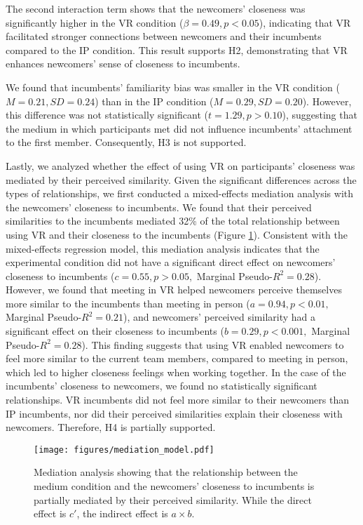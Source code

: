 The second interaction term shows that the newcomers' closeness was significantly higher in the VR condition ($\beta=0.49,p<0.05$), indicating that VR facilitated stronger connections between newcomers and their incumbents compared to the IP condition. This result supports H2, demonstrating that VR enhances newcomers' sense of closeness to incumbents.

We found that incumbents' familiarity bias was smaller in the VR condition ($M=0.21, SD=0.24$) than in the IP condition ($M=0.29, SD=0.20$). However, this difference was not statistically significant ($t=1.29, p>0.10$), suggesting that the medium in which participants met did not influence incumbents' attachment to the first member. Consequently, H3 is not supported.



Lastly, we analyzed whether the effect of using VR on participants' closeness was mediated by their perceived similarity. Given the significant differences across the types of relationships, we first conducted a mixed-effects mediation analysis with the newcomers' closeness to incumbents. We found that their perceived similarities to the incumbents mediated 32\% of the total relationship between using VR and their closeness to the incumbents (Figure \ref{fig:mediation-analysis}). Consistent with the mixed-effects regression model, this mediation analysis indicates that the experimental condition did not have a significant direct effect on newcomers' closeness to incumbents ($c=0.55,p>0.05,$ Marginal Pseudo-$R^2=0.28$). However, we found that meeting in VR helped newcomers perceive themselves more similar to the incumbents than meeting in person ($a=0.94,p<0.01,$ Marginal Pseudo-$R^2=0.21$), and newcomers' perceived similarity had a significant effect on their closeness to incumbents ($b=0.29,p<0.001,$ Marginal Pseudo-$R^2=0.28$). This finding suggests that using VR enabled newcomers to feel more similar to the current team members, compared to meeting in person, which led to higher closeness feelings when working together. In the case of the incumbents' closeness to newcomers, we found no statistically significant relationships. VR incumbents did not feel more similar to their newcomers than IP incumbents, nor did their perceived similarities explain their closeness with newcomers. Therefore, H4 is partially supported. 

\begin{figure}[!hbt]
    \centering
    \texttt{[image: figures/mediation\_model.pdf]}
    \caption{Mediation analysis showing that the relationship between the medium condition and the newcomers' closeness to incumbents is partially mediated by their perceived similarity. While the direct effect is $c'$, the indirect effect is $a \times b$.}
    \label{fig:mediation-analysis}
\end{figure}

